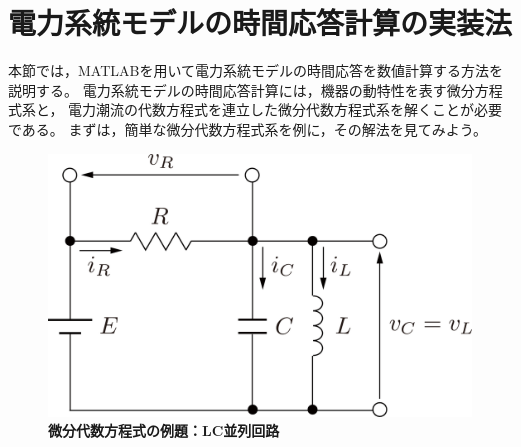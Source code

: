 \documentclass[tombow,dvipdfmx]{corona-a5-1.1}
\begin{document}
\section{電力系統モデルの時間応答計算の実装法}

本節では，MATLABを用いて電力系統モデルの時間応答を数値計算する方法を説明する。
電力系統モデルの時間応答計算には，機器の動特性を表す微分方程式系と，
電力潮流の代数方程式を連立した微分代数方程式系を解くことが必要である。
まずは，簡単な微分代数方程式系を例に，その解法を見てみよう。

\begin{figure}[t]
  \centering
  \includegraphics[width = .5\linewidth]{figs/circkawaguchi}
  \medskip
  \caption{\textbf{微分代数方程式の例題：LC並列回路}}
  \label{fig:RLC}
  \medskip
\end{figure}
\end{document}
